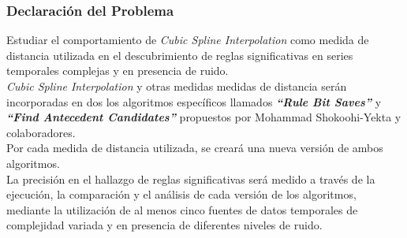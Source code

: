 \subsubsection{Declaraci\'on del Problema}
Estudiar el comportamiento de \textit{Cubic Spline Interpolation} como medida de distancia utilizada en el descubrimiento de reglas significativas en series temporales complejas y en presencia de ruido.\\
\textit{Cubic Spline Interpolation} y otras medidas medidas de distancia ser\'an incorporadas en dos los algoritmos espec\'ificos llamados \textit{\textbf{\enquote{Rule Bit Saves}}} y \textit{\textbf{\enquote{Find Antecedent Candidates}}} propuestos por Mohammad Shokoohi-Yekta y colaboradores.\\
Por cada medida de distancia utilizada, se crear\'a una nueva versi\'on de ambos algoritmos.\\
La precisi\'on en el hallazgo de reglas significativas ser\'a medido a trav\'es de la ejecuci\'on, la comparaci\'on y el an\'alisis de cada versi\'on de los algoritmos, mediante la utilizaci\'on de al menos cinco fuentes de datos temporales de complejidad variada y en presencia de diferentes niveles de ruido.
